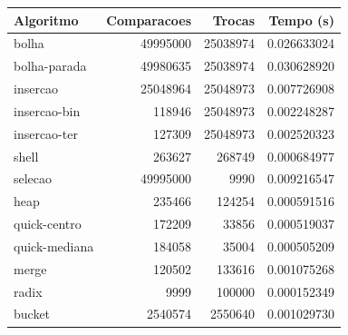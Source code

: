 \begin{tabular}{lrrr}
\hline
Algoritmo & Comparacoes & Trocas & Tempo (s) \\
\hline
bolha & 49995000 & 25038974 & 0.026633024 \\
bolha-parada & 49980635 & 25038974 & 0.030628920 \\
insercao & 25048964 & 25048973 & 0.007726908 \\
insercao-bin & 118946 & 25048973 & 0.002248287 \\
insercao-ter & 127309 & 25048973 & 0.002520323 \\
shell & 263627 & 268749 & 0.000684977 \\
selecao & 49995000 & 9990 & 0.009216547 \\
heap & 235466 & 124254 & 0.000591516 \\
quick-centro & 172209 & 33856 & 0.000519037 \\
quick-mediana & 184058 & 35004 & 0.000505209 \\
merge & 120502 & 133616 & 0.001075268 \\
radix & 9999 & 100000 & 0.000152349 \\
bucket & 2540574 & 2550640 & 0.001029730 \\
\hline
\end{tabular}
